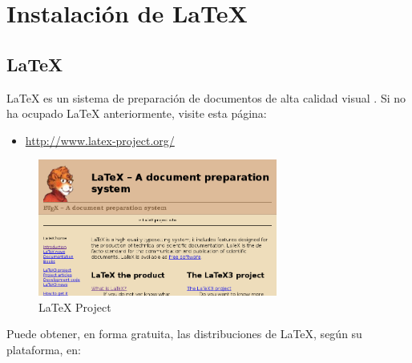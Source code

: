 
\chapter{Instalación de \LaTeX}


\section{\LaTeX}

\LaTeX{} es un sistema de preparación de documentos de alta calidad
visual \citep{latex:whatis}. Si no ha ocupado \LaTeX{} anteriormente,
visite esta página:
\begin{itemize}
\item \href{http://www.latex-project.org/}{http://www.latex-project.org/}
\end{itemize}
\begin{figure}[H]
\begin{centering}
\includegraphics[width=0.7\textwidth]{figures/fig_latex_project_org}
\par\end{centering}

\caption{LaTeX Project}
\end{figure}


Puede obtener, en forma gratuita, las distribuciones de \LaTeX{},
según su plataforma, en:

